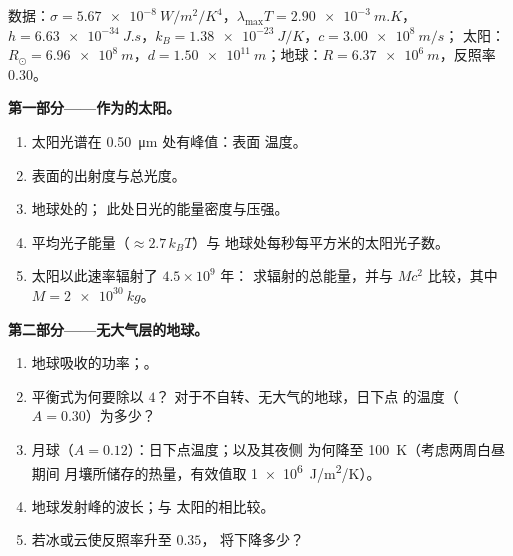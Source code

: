 \begin{problem}\label{pb:b2:thermal-radiation:1}
数据：$\sigma = \qty{5.67e-8}{W/m^2/K^4}$，$\lambda_{\max}T = \qty{2.90e-3}{m.K}$，
$h = \qty{6.63e-34}{J.s}$，$k_B = \qty{1.38e-23}{J/K}$，$c = \qty{3.00e8}{m/s}$；
太阳：$R_\odot = \qty{6.96e8}{m}$，$d = \qty{1.50e11}{m}$；地球：$R =
\qty{6.37e6}{m}$，反照率 $0.30$。

\textbf{第一部分——作为的太阳。}
\begin{enumerate}
  \item 太阳光谱在 \qty{0.50}{\micro m} 处有峰值：表面
        温度。
  \item 表面的出射度与总光度。
  \item 地球处的；
        此处日光的能量密度与压强。
  \item 平均光子能量（$\approx 2.7\,k_BT$）与
        地球处每秒每平方米的太阳光子数。
  \item 太阳以此速率辐射了 $4.5 \times 10^9$ 年：
        求辐射的总能量，并与 $Mc^2$ 比较，其中 $M = \qty{2e30}{kg}$。
\end{enumerate}

\textbf{第二部分——无大气层的地球。}
\begin{enumerate}[resume]
  \item 地球吸收的功率；。
  \item 平衡式为何要除以 $4$？
        对于不自转、无大气的地球，日下点
        的温度（$A = 0.30$）为多少？
  \item 月球（$A = 0.12$）：日下点温度；以及其夜侧
        为何降至 \qty{100}{K}（考虑两周白昼期间
        月壤所储存的热量，有效值取 \qty{1e6}{J/m^2/K}）。
  \item 地球发射峰的波长；与
        太阳的相比较。
  \item 若冰或云使反照率升至 $0.35$，
        将下降多少？
\end{enumerate}


\end{problem}
